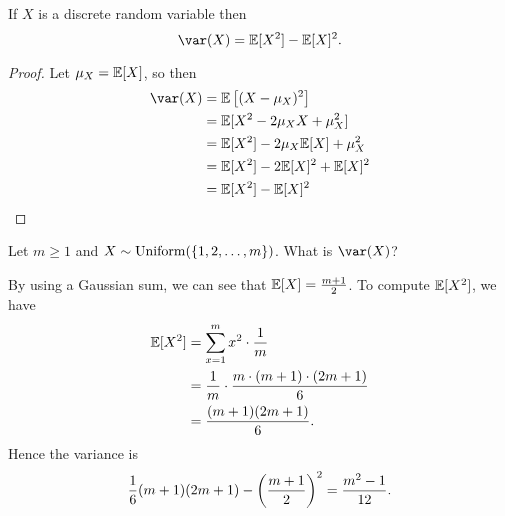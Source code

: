 \documentclass[class=article, crop=false]{standalone}
\begin{document}
  \begin{theorem}{}
    If $X$ is a discrete random variable then
    \[
      \var(X) = \E[X^2] - \E[X]^2.
    \]
    \begin{proof}
      Let $\mu_X = \mathbb{E}[X]$, so then
      \begin{align*}
        \var(X) &= \E\left[(X - \mu_X)^2\right] \\
                &= \E[X^2 - 2\mu_XX + \mu_X^2] \\
                &= \E[X^2] - 2\mu_X\E[X] + \mu_X^2 \\
                &= \E[X^2] - 2\E[X]^2 + \E[X]^2 \\
                &= \E[X^2] - \E[X]^2
      \end{align*}
    \end{proof}
  \end{theorem}
  \begin{example}{}
    Let $m \geq 1$ and $X\sim \operatorname{Uniform}(\left\{1,2,\dotsc,m\right\})$. What is $\var (X)$? \par
    By using a Gaussian sum, we can see that $\mathbb{E}[X] = \frac{m + 1}{2}$. To compute $\mathbb{E}[X^2]$, we have
    \begin{align*}
      \mathbb{E}[X^2] &= \sum_{x=1}^{m}x^2\cdot \frac{1}{m} \\
              &= \frac{1}{m}\cdot \frac{m\cdot (m + 1)\cdot (2m + 1)}{6} \\
              &= \frac{(m + 1)(2m + 1)}{6}.
    \end{align*}
    Hence the variance is
    \[
      \frac{1}{6}(m + 1)(2m + 1) - \left( \frac{m + 1}{2} \right)^2 = \frac{m^2 - 1}{12}.
    \]
  \end{example}
\end{document}
